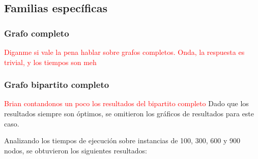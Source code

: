 \subsection{Familias específicas}
\subsubsection{Grafo completo}

\textcolor{red}{Diganme si vale la pena hablar sobre grafos completos. Onda, la respuesta es trivial, y los tiempos son meh}

\subsubsection{Grafo bipartito completo}

\textcolor{red}{Brian contandonos un poco los resultados del bipartito completo}
Dado que los resultados siempre son \'optimos, se omitieron los gr\'aficos de resultados para este caso.

Analizando los tiempos de ejecución sobre instancias de 100, 300, 600 y 900 nodos, se obtuvieron los siguientes resultados:

